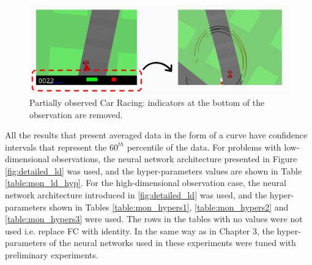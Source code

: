 \begin{figure}[h]
    \centering
    \includegraphics[width=0.7\linewidth]{imagenes/cap4/car_racing_no_inds.PNG}
    \caption[Partially observed Car Racing.]{Partially observed Car Racing: indicators at the bottom of the observation are removed.}
    \label{fig:no_inds_car_racing}
\end{figure}

All the results that present averaged data in the form of a curve have confidence intervals that represent the $60^{th}$ percentile of the data. For problems with low-dimensional observations, the neural network architecture presented in Figure \ref{fig:detailed_ld} was used, and the hyper-parameters values are shown in Table \ref{table:mon_ld_hyp}. For the high-dimensional observation case, the neural network architecture introduced in \ref{fig:detailed_ld} was used, and the hyper-parameters shown in Tables \ref{table:mon_hypers1}, \ref{table:mon_hypers2} and \ref{table:mon_hypers3} were used. The rows in the tables with no values were not used i.e. replace FC with identity. In the same way as in Chapter 3, the hyper-parameters of the neural networks used in these experiments were tuned with preliminary experiments.

